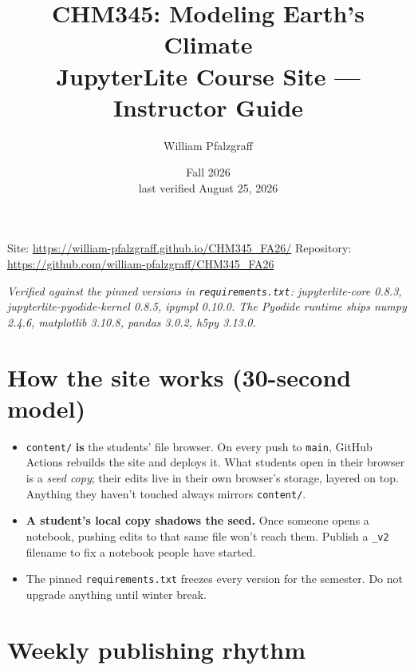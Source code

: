 \documentclass[11pt]{article}
\title{\textbf{CHM345: Modeling Earth's Climate}\\[4pt]
       \Large JupyterLite Course Site --- Instructor Guide}
\author{William Pfalzgraff}
\date{Fall 2026 \\[2pt] \small last verified August 25, 2026}
\newcommand{\code}[1]{\texttt{\small #1}}
\begin{document}
\maketitle

\begin{center}
\small
Site: \url{https://william-pfalzgraff.github.io/CHM345_FA26/} \qquad
Repository: \url{https://github.com/william-pfalzgraff/CHM345_FA26}
\end{center}

\noindent\emph{Verified against the pinned versions in \code{requirements.txt}:
jupyterlite-core 0.8.3, jupyterlite-pyodide-kernel 0.8.5, ipympl 0.10.0.
The Pyodide runtime ships numpy 2.4.6, matplotlib 3.10.8, pandas 3.0.2, h5py 3.13.0.}

\section{How the site works (30-second model)}

\begin{itemize}[itemsep=2pt]
  \item \code{content/} \textbf{is} the students' file browser. On every push to
    \code{main}, GitHub Actions rebuilds the site and deploys it. What students
    open in their browser is a \emph{seed copy}; their edits live in their own
    browser's storage, layered on top. Anything they haven't touched always
    mirrors \code{content/}.
  \item \textbf{A student's local copy shadows the seed.} Once someone opens a
    notebook, pushing edits to that same file won't reach them. Publish a
    \code{\_v2} filename to fix a notebook people have started.
  \item The pinned \code{requirements.txt} freezes every version for the
    semester. Do not upgrade anything until winter break.
\end{itemize}

\section{Weekly publishing rhythm}
\end{document}
